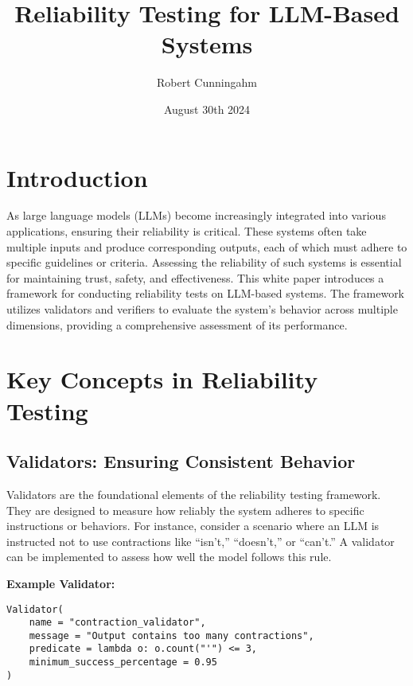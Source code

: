 \documentclass{article}
\title{Reliability Testing for LLM-Based Systems}
\author{Robert Cunningahm}
\date{August 30th 2024}
\begin{document}
\maketitle

\section{Introduction}

As large language models (LLMs) become increasingly integrated into various applications, ensuring their reliability is critical. These systems often take multiple inputs and produce corresponding outputs, each of which must adhere to specific guidelines or criteria. Assessing the reliability of such systems is essential for maintaining trust, safety, and effectiveness. This white paper introduces a framework for conducting reliability tests on LLM-based systems. The framework utilizes validators and verifiers to evaluate the system's behavior across multiple dimensions, providing a comprehensive assessment of its performance.

\pagebreak
\section{Key Concepts in Reliability Testing}

\subsection{Validators: Ensuring Consistent Behavior}

Validators are the foundational elements of the reliability testing framework. They are designed to measure how reliably the system adheres to specific instructions or behaviors. For instance, consider a scenario where an LLM is instructed not to use contractions like ``isn't,'' ``doesn't,'' or ``can't.'' A validator can be implemented to assess how well the model follows this rule.

\vspace{1em}
\textbf{Example Validator:}
\begin{center}
\begin{minipage}{0.9\linewidth}
\begin{lstlisting}
Validator(
    name = "contraction_validator",
    message = "Output contains too many contractions",
    predicate = lambda o: o.count("'") <= 3,
    minimum_success_percentage = 0.95
)
\end{lstlisting}
\end{minipage}
\end{center}
\end{document}
